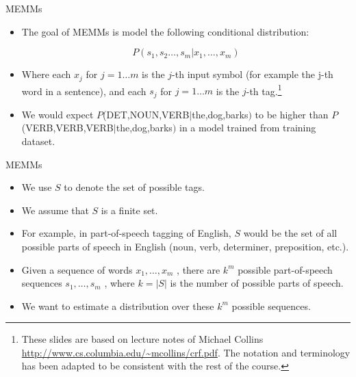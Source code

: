 \documentclass[handout]{beamer}
\begin{document}
\begin{frame}{MEMMs}
\begin{scriptsize}
\begin{itemize}


 \item The goal of MEMMs is  model the following conditional distribution:
 
 \begin{displaymath}
  P(s_1,s_2 \dots, s_m | x_1, \dots, x_m)
 \end{displaymath}

 \item Where each $x_j$ for $j = 1 \dots m$ is the $j$-th input symbol (for example the j-th word in a sentence), and each $s_j$ for $j = 1 \dots m$ is the $j$-th tag.\footnote{These slides are based on lecture notes of Michael Collins \url{http://www.cs.columbia.edu/~mcollins/crf.pdf}. The notation and terminology has been adapted to be consistent with the rest of the course.}

\item We would expect $P$(DET,NOUN,VERB$|$the,dog,barks$)$ to be higher than $P$(VERB,VERB,VERB$|$the,dog,barks$)$ in a model trained from training dataset.
 
\end{itemize}


\end{scriptsize}
\end{frame}


\begin{frame}{MEMMs}
\begin{scriptsize}
\begin{itemize}
\item We use $S$ to denote the set of possible tags.
\item We assume that $S$ is a finite set. 
 \item For example, in part-of-speech tagging of English, $S$ would be the set of all possible parts of speech in English (noun, verb, determiner, preposition, etc.).
 \item Given a sequence of words $x_1, \dots, x_m$ , there are $k^m$ possible part-of-speech sequences $s_1, \dots, s_m$ , where $k = |S|$ is the number of possible parts of speech.
 \item We want to estimate a distribution over these $k^m$ possible sequences.
\end{itemize}


\end{scriptsize}
\end{frame}
\end{document}
